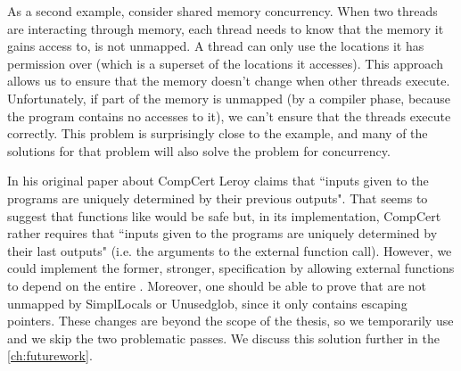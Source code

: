 As a second example, consider shared memory concurrency. When two threads are interacting through memory, each thread needs to know that the memory it gains access to, is not unmapped. A thread can only use the locations it has permission over (which is a superset of the locations it accesses). This approach allows us to ensure that the memory doesn't change when other threads execute. Unfortunately, if part of the memory is unmapped (by a compiler phase, because the program contains no accesses to it), we can't ensure that the threads execute correctly. This problem is surprisingly close to the   example, and many of the solutions for that problem will also solve the problem for concurrency. 

In his original paper about CompCert Leroy \cite{Leroy-Compcert-CACM} claims that ``inputs given to the programs are uniquely determined by their previous outputs". That seems to suggest that functions like  would be safe but, in its implementation, CompCert rather requires that ``inputs given to the programs are uniquely determined by their last outputs" (i.e. the arguments to the external function call). However, we could implement the former, stronger, specification by allowing external functions to depend on the entire . Moreover, one should be able to prove that  are not unmapped by SimplLocals or Unusedglob, since it only contains escaping pointers. These changes are beyond the scope of the thesis, so we temporarily use  and we skip the two problematic passes. We discuss this solution further in the \cref{ch:futurework}.

